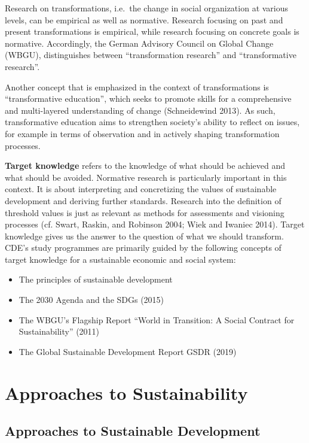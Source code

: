 \documentclass[
  a4paper,
  openany]{book}
\providecommand{\tightlist}{%
  \setlength{\itemsep}{0pt}\setlength{\parskip}{0pt}}
\begin{document}
Research on transformations, i.e.~the change in social organization at
various levels, can be empirical as well as normative. Research focusing
on past and present transformations is empirical, while research
focusing on concrete goals is normative. Accordingly, the German
Advisory Council on Global Change (WBGU), distinguishes between
``transformation research'' and ``transformative research''.

Another concept that is emphasized in the context of transformations is
``transformative education'', which seeks to promote skills for a
comprehensive and multi-layered understanding of change (Schneidewind
2013). As such, transformative education aims to strengthen society's
ability to reflect on issues, for example in terms of observation and in
actively shaping transformation processes.

\textbf{Target knowledge} refers to the knowledge of what should be
achieved and what should be avoided. Normative research is particularly
important in this context. It is about interpreting and concretizing the
values of sustainable development and deriving further standards.
Research into the definition of threshold values is just as relevant as
methods for assessments and visioning processes (cf. Swart, Raskin, and
Robinson 2004; Wiek and Iwaniec 2014). Target knowledge gives us the
answer to the question of what we should transform. CDE's study
programmes are primarily guided by the following concepts of target
knowledge for a sustainable economic and social system:

\begin{itemize}
\tightlist
\item
  The principles of sustainable development
\item
  The 2030 Agenda and the SDGs (2015)
\item
  The WBGU's Flagship Report ``World in Transition: A Social Contract
  for Sustainability'' (2011)
\item
  The Global Sustainable Development Report GSDR (2019)
\end{itemize}

\part{Approaches to Sustainability}

\chapter{Approaches to Sustainable
Development}\label{approaches-to-sustainable-development}
\end{document}
